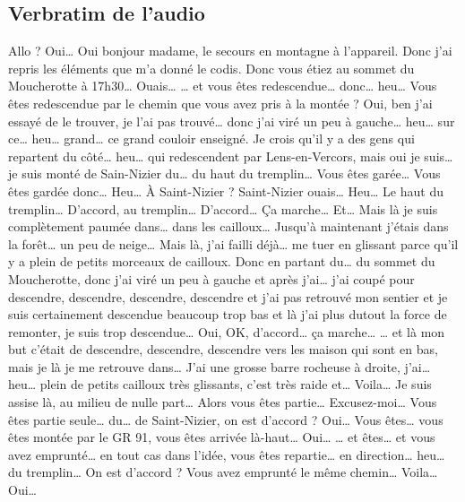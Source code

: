 


\subsection{Verbratim de l'audio}


\begin{dialogue}
  \Sec Allo ?
  \Req Oui…
  \Sec Oui bonjour madame, le secours en montagne à l'appareil. Donc
  j'ai repris les éléments que m'a donné le \ac{codis}. Donc vous
  étiez au sommet du Moucherotte à 17h30…
  \Req Ouais…
  \Sec … et vous êtes redescendue… donc… heu… Vous êtes redescendue
  par le chemin que vous avez pris à la montée ?
  \Req Oui, ben j'ai essayé de le trouver, je l'ai pas trouvé… donc
  j'ai viré un peu à gauche… heu… sur ce… heu… grand… ce grand couloir
  enseigné. Je crois qu'il y a des gens qui repartent du côté… heu…
  qui redescendent par Lens-en-Vercors, mais oui je suis… je suis
  monté de Sain-Nizier du… du haut du tremplin…
  \Sec Vous êtes garée… Vous êtes gardée donc… Heu… À Saint-Nizier ?
  \Req Saint-Nizier ouais… Heu… Le haut du tremplin…
  \Sec D'accord, au tremplin… D'accord… Ça marche…
  \Req Et… Mais là je suis complètement paumée dans… dans les
  cailloux… Jusqu'à maintenant j’étais dans la forêt… un peu de neige…
  Mais là, j'ai failli déjà… me tuer en glissant parce qu’il y a plein
  de petits morceaux de cailloux. Donc en partant du… du sommet du
  Moucherotte, donc j'ai viré un peu à gauche et après j'ai… j'ai
  coupé pour descendre, descendre, descendre, descendre et j'ai pas retrouvé mon
  sentier et je suis certainement descendue beaucoup trop bas et là
  j'ai plus dutout la force de remonter, je suis trop descendue…
  \Sec {} Oui, OK, d'accord… ça marche…
  \Req … et là mon but c'était de descendre, descendre, descendre vers
  les maison qui sont en bas, mais je là je me retrouve dans… J'ai une
  grosse barre rocheuse à droite, j'ai… heu… plein de petits cailloux
  très glissants, c'est très raide et… Voila… Je suis assise là, au
  milieu de nulle part…
  \Sec {} Alors vous êtes partie…
  Excusez-moi… Vous êtes partie seule… du… de Saint-Nizier, on est
  d'accord ?
  \Req Oui…
  \Sec Vous êtes… vous êtes montée par le GR 91, vous êtes arrivée
  là-haut…
  \Req {} Oui…
  \Sec … et êtes… et vous avez emprunté… en tout cas dans l'idée, vous
  êtes repartie… en direction… heu… du tremplin… On est d'accord ?
  Vous avez emprunté le même chemin…
  \Req {} Voila… Oui…

\end{dialogue}
